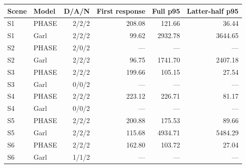 \begin{tabular}{llrrrr}
\toprule
Scene & Model & D/A/N & First response & Full p95 & Latter-half p95 \\
\midrule
S1 & PHASE & 2/2/2 & 208.08 & 121.66 & 36.44 \\
S1 & Garl & 2/2/2 & 99.62 & 2932.78 & 3644.65 \\
S2 & PHASE & 2/0/2 & --- & --- & --- \\
S2 & Garl & 2/2/2 & 96.75 & 1741.70 & 2407.18 \\
S3 & PHASE & 2/2/2 & 199.66 & 105.15 & 27.54 \\
S3 & Garl & 0/0/2 & --- & --- & --- \\
S4 & PHASE & 2/2/2 & 223.12 & 226.71 & 81.17 \\
S4 & Garl & 0/0/2 & --- & --- & --- \\
S5 & PHASE & 2/2/2 & 200.88 & 175.53 & 89.66 \\
S5 & Garl & 2/2/2 & 115.68 & 4934.71 & 5484.29 \\
S6 & PHASE & 2/2/2 & 162.80 & 103.72 & 27.04 \\
S6 & Garl & 1/1/2 & --- & --- & --- \\
\bottomrule
\end{tabular}
